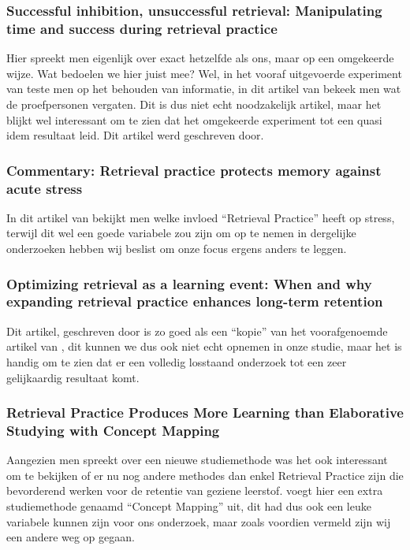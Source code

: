 \documentclass{hogent-article}
\begin{document}
\subsubsection{Successful inhibition, unsuccessful retrieval: Manipulating time and success during retrieval practice}

Hier spreekt men eigenlijk over exact hetzelfde als ons, maar op een omgekeerde wijze. Wat bedoelen we hier juist mee? Wel, in het vooraf uitgevoerde experiment van \textcite{Roediger_2006} teste men op het behouden van informatie, in dit artikel van \textcite{Storm_2010} bekeek men wat de proefpersonen vergaten. Dit is dus niet echt noodzakelijk artikel, maar het blijkt wel interessant om te zien dat het omgekeerde experiment tot een quasi idem resultaat leid. Dit artikel werd geschreven door. 

\subsubsection{Commentary: Retrieval practice protects memory against acute stress}

In dit artikel van \textcite{Smith_2016} bekijkt men welke invloed ``Retrieval Practice'' heeft op stress, terwijl dit wel een goede variabele zou zijn om op te nemen in dergelijke onderzoeken hebben wij beslist om onze focus ergens anders te leggen.

\subsubsection{Optimizing retrieval as a learning event: When and why expanding retrieval practice enhances long-term retention}

Dit artikel, geschreven door \textcite{Storm_2010} is zo goed als een ``kopie'' van het voorafgenoemde artikel van \textcite{Roediger_2006}, dit kunnen we dus ook niet echt opnemen in onze studie, maar het is handig om te zien dat er een volledig losstaand onderzoek tot een zeer gelijkaardig resultaat komt. 

\subsubsection{Retrieval Practice Produces More Learning than Elaborative Studying with Concept Mapping}

Aangezien men spreekt over een nieuwe studiemethode was het ook interessant om te bekijken of er nu nog andere methodes dan enkel Retrieval Practice zijn die bevorderend werken voor de retentie van geziene leerstof. \textcite{Karpicke_2011} voegt hier een extra studiemethode genaamd ``Concept Mapping'' uit, dit had dus ook een leuke variabele kunnen zijn voor ons onderzoek, maar zoals voordien vermeld zijn wij een andere weg op gegaan.


\printbibliography[heading=bibintoc]
\end{document}
